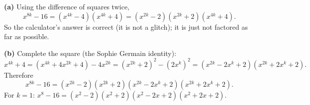 \textbf{(a)} Using the difference of squares twice,
\[
x^{8k}-16=\left(x^{4k}-4\right)\left(x^{4k}+4\right)=\left(x^{2k}-2\right)\left(x^{2k}+2\right)\left(x^{4k}+4\right).
\]
So the calculator's answer is correct (it is not a glitch); it is just not factored as far as possible.

\textbf{(b)} Complete the square (the Sophie Germain identity):
\[
x^{4k}+4=\left(x^{4k}+4x^{2k}+4\right)-4x^{2k}=\left(x^{2k}+2\right)^2-\left(2x^k\right)^2=\left(x^{2k}-2x^k+2\right)\left(x^{2k}+2x^k+2\right).
\]
Therefore
\[
\boxed{x^{8k}-16=\left(x^{2k}-2\right)\left(x^{2k}+2\right)\left(x^{2k}-2x^k+2\right)\left(x^{2k}+2x^k+2\right)}.
\]
For $k=1$: $x^8-16=(x^2-2)(x^2+2)(x^2-2x+2)(x^2+2x+2)$.

